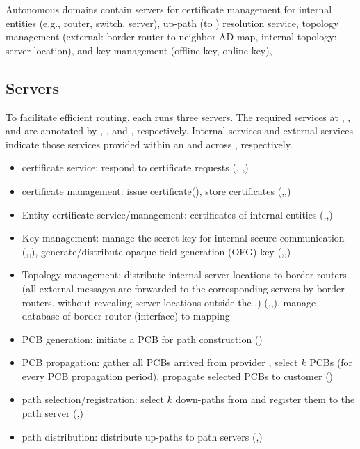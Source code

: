  Autonomous domains contain servers for certificate management for internal entities (e.g., router, switch, server), up-path (to \ISDC) resolution service, topology management (external: border router to neighbor AD map, internal topology: server location), and key management (offline key, online key), 

\subsection{Servers}
To facilitate efficient routing, each \AD runs three servers. The required services at \ISDC \AD, \TRAN \AD, and \STUB \AD are annotated by \CAD, \TAD, and \EAD, respectively. Internal services and external services indicate those services provided within an \AD and across \ADs, respectively.

\begin{itemize}
\item \AD certificate service: respond to certificate requests (\CAD, \TAD,\EAD) 
\item \AD certificate management: issue certificate(\CAD), store certificates (\CAD,\TAD,\EAD)
\item Entity certificate service/management: certificates of internal entities (\CAD,\TAD,\EAD)  
\item Key management: manage the secret key for internal secure communication (\CAD,\TAD,\EAD), generate/distribute opaque field generation (OFG) key (\CAD,\TAD,\EAD) 
\item Topology management: distribute internal server locations to border routers (all external messages are forwarded to the corresponding servers by border routers, without revealing server locations outside the \AD.) (\CAD,\TAD,\EAD), manage database of border router (interface) to \AD mapping
\end{itemize}

\begin{itemize}
\item PCB generation: initiate a PCB for path construction (\CAD)
\item PCB propagation: gather all PCBs arrived from provider \ADs, select $k$ PCBs (for every PCB propagation period), propagate selected PCBs to customer \ADs (\TAD)
\item path selection/registration: select $k$ down-paths from \ISDC and register them to the \ISDC path server (\TAD,\EAD)
\item path distribution: distribute up-paths to path servers (\TAD,\EAD) 
\end{itemize}

